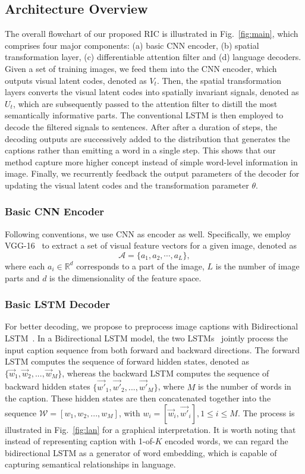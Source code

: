 \documentclass[10pt,twocolumn,letterpaper]{article}
\begin{document}
	\subsection{Architecture Overview}
	The overall flowchart of our proposed RIC is illustrated in Fig.~\ref{fig:main}, which comprises four major components: (a) basic CNN encoder, (b) spatial transformation layer, (c) differentiable attention filter and (d) language decoders. Given a set of training images, we feed them into the CNN encoder, which outputs visual latent codes, denoted as $V_{t}$. Then, the spatial transformation layers converts the visual latent codes into spatially invariant signals, denoted as $U_{t}$, which are subsequently passed to the attention filter to distill the most semantically informative parts. The conventional LSTM is then employed to decode the filtered signals to sentences. After after a duration of steps, the decoding outputs are successively added to the distribution that generates the captions rather than emitting a word in a single step. This shows that our method capture more higher concept instead of simple word-level information in image. Finally, we recurrently feedback the output parameters of the decoder for updating the visual latent codes and the transformation parameter $\theta$.
	
	
	\subsubsection{Basic CNN Encoder}
	Following conventions, we use CNN as encoder as well. Specifically, we employ VGG-16~\cite{simonyan2014very} to extract a set of visual feature vectors for a given image, denoted as
	\begin{equation}
	\mathcal{A}  = \{ {a _1},{a _2}, \cdots ,{a _L}\},
	\end{equation}
	where each ${a_i} \in {\mathbb{R}^d}$ corresponds to a part of the image, $L$ is the number of image parts and $d$ is the dimensionality of the feature space.
	
	\subsubsection{Basic LSTM Decoder}
	
	
	For better decoding, we propose to preprocess image captions with Bidirectional LSTM~\cite{}. In a Bidirectional LSTM model, the two LSTMs~\cite{hochreiter1997long} jointly process the input caption sequence from both forward and backward directions. The forward LSTM computes the sequence of forward hidden states, denoted as $\{\vec{w}_1,\vec{w}_2,...,\vec{w}_M\}$, whereas the backward LSTM computes the sequence of backward hidden states $\{\vec{w'}_1,\vec{w'}_2,...,\vec{w'}_M\}$, where $M$ is the number of words in the caption. These hidden states are then concatenated together into the sequence $\mathcal{W} = [w_ 1, w_2,...,w_M ]$, with $w_i = [\vec{w}_i, \vec{w'}_i], 1 \leq i \leq M$. The process is illustrated in Fig.~\ref{fig:lan} for a graphical interpretation. It is worth noting that instead of representing caption with 1-of-$K$ encoded words, we can regard the bidirectional LSTM as a generator of word embedding, which is capable of capturing semantical relationships in language.
	
\end{document}
